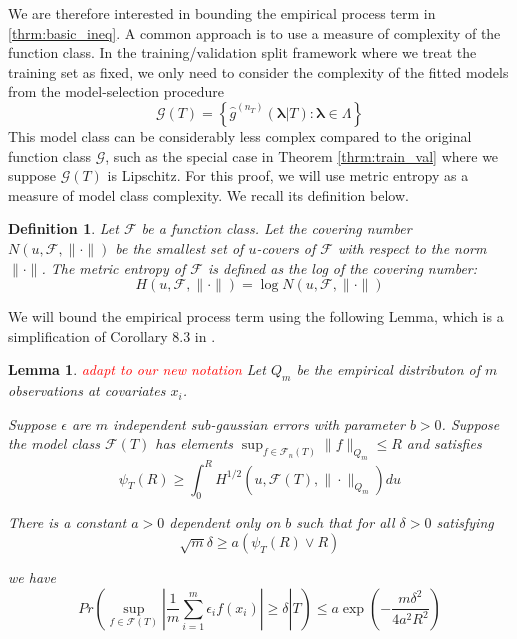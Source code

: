 \documentclass[12pt]{article}
\newtheorem{lemma}{Lemma}
\newtheorem{definition}{Definition}
\begin{document}
We are therefore interested in bounding the empirical process term in \eqref{thrm:basic_ineq}. A common approach is to use a measure of complexity of the function class. In the training/validation split framework where we treat the training set as fixed, we only need to consider the complexity of the fitted models from the model-selection procedure
\begin{equation}
\mathcal{G}(T)=\left\{ \hat{g}^{(n_T)}(\boldsymbol{\lambda}|T) : \boldsymbol{\lambda} \in \Lambda \right\}
\end{equation}
This model class can be considerably less complex compared to the original function class $\mathcal{G}$, such as the special case in Theorem \ref{thrm:train_val} where we suppose $\mathcal{G}(T)$ is Lipschitz. For this proof, we will use metric entropy as a measure of model class complexity. We recall its definition below.
\begin{definition}
	Let $\mathcal{F}$ be a function class. Let the covering number $N(u, \mathcal{F}, \| \cdot \|)$ be the smallest set of $u$-covers of $\mathcal{F}$ with respect to the norm $\| \cdot \|$. The metric entropy of $\mathcal{F}$ is defined as the log of the covering number:
\begin{equation}
H (u, \mathcal{F}, \| \cdot \| ) = \log N(u, \mathcal{F}, \| \cdot \|)
\end{equation}
\end{definition}

We will bound the empirical process term using the following Lemma, which is a simplification of Corollary 8.3 in \citet{van2000empirical}.

\begin{lemma}
	\label{lemma:cor83}
	\textcolor{red}{adapt to our new notation}
	Let $Q_{m}$ be the empirical distributon of $m$ observations at
	covariates $x_{i}$.
	
	Suppose $\epsilon$ are $m$ independent sub-gaussian errors with parameter $b > 0$. Suppose
	the model class $\mathcal{F}(T)$ has elements $\sup_{f\in\mathcal{F}_{n}(T)}\|f\|_{Q_{m}}\le R$
	and satisfies
	\[
	\psi_{T}(R)\ge\int_{0}^{R}H^{1/2}(u,\mathcal{F}(T),\|\cdot\|_{Q_{m}})du
	\]
	
	
	There is a constant $a > 0$ dependent only on $b$ such that
	for all $\delta>0$ satisfying
	\[
	\sqrt{m}\delta\ge a(\psi_{T}(R)\vee R)
	\]
	
	
	we have 
	\[
	Pr\left(\left.\sup_{f\in\mathcal{F}(T)}\left|\frac{1}{m}\sum_{i=1}^{m}\epsilon_{i}f(x_{i})\right|\ge\delta\right|T\right)\le a\exp\left(-\frac{m\delta^{2}}{4a^{2}R^{2}}\right)
	\]
	
\end{lemma}
\end{document}
